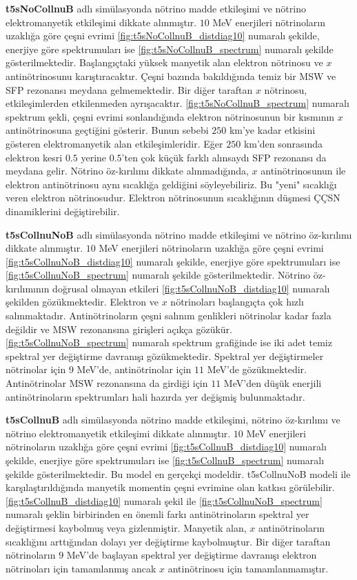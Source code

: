 \textbf{t5sNoCollnuB} adlı simülasyonda nötrino madde etkileşimi ve nötrino elektromanyetik etkileşimi dikkate alınmıştır. $ 10 $ MeV enerjileri nötrinoların uzaklığa göre çeşni evrimi \ref{fig:t5sNoCollnuB_distdiag10} numaralı şekilde, enerjiye göre spektrumuları ise \ref{fig:t5sNoCollnuB_spectrum} numaralı şekilde gösterilmektedir. Başlangıçtaki yüksek manyetik alan elektron nötrinosu ve $ x $ antinötrinosunu karıştıracaktır. Çeşni bazında bakıldığında temiz bir MSW ve SFP rezonansı meydana gelmemektedir. Bir diğer taraftan $ x $ nötrinosu, etkileşimlerden etkilenmeden ayrışacaktır. \ref{fig:t5sNoCollnuB_spectrum} numaralı spektrum şekli, çeşni evrimi sonlandığında elektron nötrinosunun bir kısmının $ x $ antinötrinosuna geçtiğini gösterir. Bunun sebebi $ 250 $ km'ye kadar etkisini gösteren elektromanyetik alan etkileşimleridir. Eğer $ 250 $ km'den sonrasında elektron kesri $ 0.5 $ yerine $ 0.5 $'ten çok küçük farklı alınsaydı SFP rezonansı da meydana gelir. Nötrino öz-kırılımı dikkate alınmadığında, $ x $ antinötrinosunun ile elektron antinötrinosu aynı sıcaklığa geldiğini söyleyebiliriz. Bu "yeni" sıcaklığı veren elektron nötrinosudur. Elektron nötrinosunun sıcaklığının düşmesi ÇÇSN dinamiklerini değiştirebilir.

\textbf{t5sCollnuNoB} adlı simülasyonda nötrino madde etkileşimi ve nötrino öz-kırılımı dikkate alınmıştır. $ 10 $ MeV enerjileri nötrinoların uzaklığa göre çeşni evrimi \ref{fig:t5sCollnuNoB_distdiag10} numaralı şekilde, enerjiye göre spektrumuları ise \ref{fig:t5sCollnuNoB_spectrum} numaralı şekilde gösterilmektedir. Nötrino öz-kırılımının doğrusal olmayan etkileri \ref{fig:t5sCollnuNoB_distdiag10} numaralı şekilden gözükmektedir. Elektron ve $ x $ nötrinoları başlangıçta çok hızlı salınmaktadır. Antinötrinoların çeşni salınım genlikleri nötrinolar kadar fazla değildir ve MSW rezonansına girişleri açıkça gözükür. \ref{fig:t5sCollnuNoB_spectrum} numaralı spektrum grafiğinde ise iki adet temiz spektral yer değiştirme davranışı gözükmektedir. Spektral yer değiştirmeler nötrinolar için $ 9 $ MeV'de, antinötrinolar için $ 11 $ MeV'de gözükmektedir. Antinötrinolar MSW rezonansına da girdiği için $ 11 $ MeV'den düşük enerjili antinötrinoların spektrumları hali hazırda yer değişmiş bulunmaktadır.

\textbf{t5sCollnuB} adlı simülasyonda nötrino madde etkileşimi, nötrino öz-kırılımı ve nötrino elektromanyetik etkileşimi dikkate alınmıştır. $ 10 $ MeV enerjileri nötrinoların uzaklığa göre çeşni evrimi \ref{fig:t5sCollnuB_distdiag10} numaralı şekilde, enerjiye göre spektrumuları ise \ref{fig:t5sCollnuB_spectrum} numaralı şekilde gösterilmektedir. Bu model en gerçekçi modeldir. t5sCollnuNoB modeli ile karşılaştırıldığında manyetik momentin çeşni evrimine olan katkısı görülebilir. \ref{fig:t5sCollnuB_distdiag10} numaralı şekil ile \ref{fig:t5sCollnuNoB_spectrum} numaralı şeklin birbirinden en önemli farkı antinötrinoların spektral yer değiştirmesi kaybolmuş veya gizlenmiştir. Manyetik alan, $ x $ antinötrinoların sıcaklığını arttığından dolayı yer değiştirme kaybolmuştur. Bir diğer taraftan nötrinoların $ 9 $ MeV'de başlayan spektral yer değiştirme davranışı elektron nötrinoları için tamamlanmış ancak $ x $ antinötrinosu için tamamlanmamıştır.

